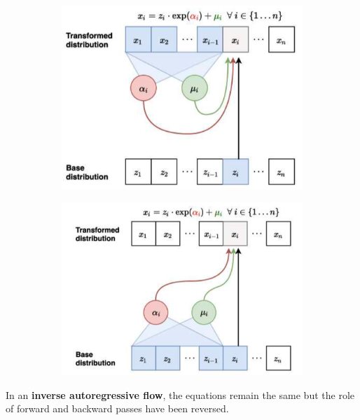 \documentclass{article}
\begin{document}
  \begin{figure}[H]
    \centering
    \begin{subfigure}[b]{0.45\textwidth}
      \centering
      \includegraphics[scale=0.36]{img/maf.png}
      \caption{}
      \label{fig:maf}
    \end{subfigure}
    \hfill 
    \begin{subfigure}[b]{0.48\textwidth}
      \centering
      \includegraphics[width=\textwidth]{img/iaf.png}
      \caption{}
      \label{fig:iaf}
    \end{subfigure}
    \caption{}
    \label{fig:maf_vs_iaf}
  \end{figure}

  In an \textbf{inverse autoregressive flow}, the equations remain the same but the role of forward and backward passes have been reversed. 
\end{document}
